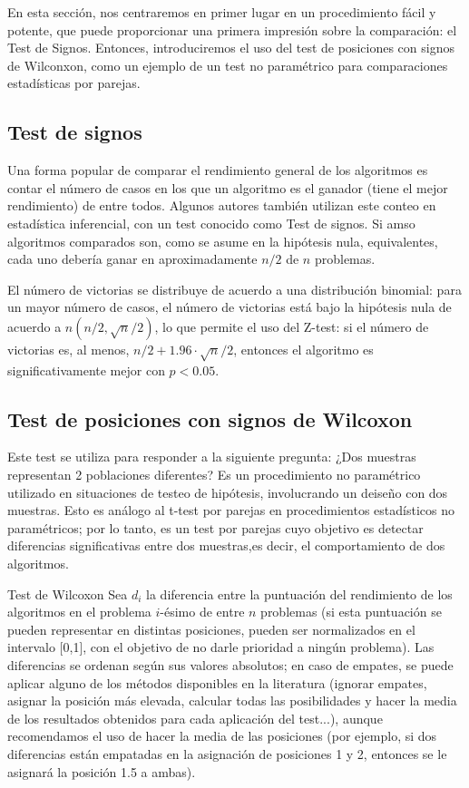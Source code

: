 En esta sección, nos centraremos en primer lugar en un procedimiento fácil y potente, que puede proporcionar una primera impresión sobre la comparación: el Test de Signos. 
Entonces, introduciremos el uso del test de posiciones con signos de Wilconxon, como un ejemplo de un test no paramétrico para comparaciones estadísticas por parejas. 

\subsection{Test de signos}

Una forma popular de comparar el rendimiento general de los algoritmos es contar el número de casos en los que un algoritmo es el ganador (tiene el mejor rendimiento) de entre todos. 
Algunos autores también utilizan este conteo en estadística inferencial, con un test conocido como Test de signos. 
Si amso algoritmos comparados son, como se asume en la hipótesis nula, equivalentes, cada uno debería ganar en aproximadamente $n/2$ de $n$ problemas. 

El número de victorias se distribuye de acuerdo a una distribución binomial: para un mayor número de casos, el número de victorias está bajo la hipótesis nula de acuerdo a $n(n/2, \sqrt{n}/2)$, lo que permite el uso del Z-test: si el número de victorias es, al menos, $n/2 + 1.96\cdot \sqrt{n}/2$, entonces el algoritmo es significativamente mejor con $p < 0.05$. 

\subsection{Test de posiciones con signos de Wilcoxon}

Este test se utiliza para responder a la siguiente pregunta: ¿Dos muestras representan 2 poblaciones diferentes? 
Es un procedimiento no paramétrico utilizado en situaciones de testeo de hipótesis, involucrando un deiseño con dos muestras. 
Esto es análogo al t-test por parejas en procedimientos estadísticos no paramétricos; por lo tanto, es un test por parejas cuyo objetivo es detectar diferencias significativas entre dos  muestras,es decir, el comportamiento de dos algoritmos. 

\begin{definicion}{Test de Wilcoxon}
Sea $d_i$ la diferencia entre la puntuación del rendimiento de los algoritmos en el problema $i$-ésimo de entre $n$ problemas (si esta puntuación se pueden representar en distintas posiciones, pueden ser normalizados en el intervalo [0,1], con el objetivo de no darle prioridad a ningún problema). 
Las diferencias se ordenan según sus valores absolutos; en caso de empates, se puede aplicar alguno de los métodos disponibles en la literatura (ignorar empates, asignar la posición más elevada, calcular todas las posibilidades y hacer la media de los resultados obtenidos para cada aplicación del test...), aunque recomendamos el uso de hacer la media de las posiciones (por ejemplo, si dos diferencias están empatadas en la asignación de posiciones 1 y 2, entonces se le asignará la posición 1.5 a ambas).
\end{definicion} 


